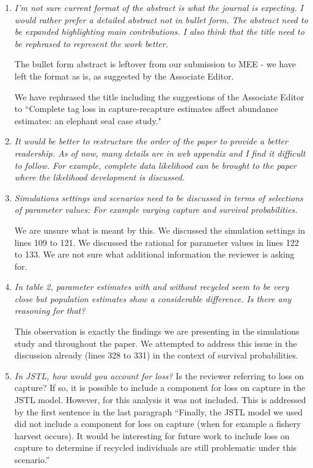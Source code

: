 \documentclass[12pt]{article}
\begin{document}
\begin{enumerate}
\item  {\it I’m not sure current format of the abstract is what the journal is expecting. I would rather prefer a detailed abstract not in bullet form. The abstract need to be expanded highlighting main contributions.   I also think that the title need to be rephrased to represent the work better. }

The bullet form abstract is leftover from our submission to MEE - we have left the format as is, as suggested by the Associate Editor.

We have rephrased the title including the suggestions of the Associate Editor to ``Complete tag loss in capture-recapture estimates affect abundance estimates: an elephant seal case study."

\item {\it It would be better to restructure the order of the paper to provide a better readership. As of now, many details are in web appendix and I find it difficult to follow. For example, complete data likelihood can be brought to the paper where the likelihood development is discussed.}


\item {\it Simulations settings and scenarios need to be discussed in terms of selections of parameter values: For example varying capture and survival probabilities.}

We are unsure what is meant by this. We discussed the simulation settings in lines 109 to 121.  We discussed the rational for parameter values in lines 122 to 133.  We are not sure what additional information the reviewer is asking for.

\item {\it In table 2, parameter estimates with and without recycled seem to be very close but population estimates show a considerable difference. Is there any reasoning for that?}

This observation is exactly the findings we are presenting in the simulations study and throughout the paper.  We attempted to address this issue in the discussion already (lines 328 to 331) in the context of survival probabilities.


\item {\it In JSTL, how would you account for loss?}
Is the reviewer referring to loss on capture? If so, it is possible to include a component for loss on capture in the JSTL model. However, for this analysis it was not included. This is addressed by the first sentence in the last paragraph ``Finally, the JSTL model we used did not include a component for loss on capture (when for example a fishery harvest occurs).  It would be interesting for future work to include loss on capture to determine if recycled individuals are still problematic under this scenario.''
\end{enumerate}
\end{document}

